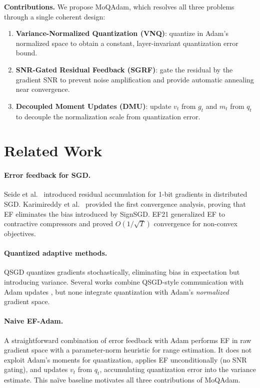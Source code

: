 \documentclass[10pt,twocolumn]{article}
\begin{document}
\textbf{Contributions.}  We propose MoQAdam, which resolves all three
problems through a single coherent design:

\begin{enumerate}
  \item \textbf{Variance-Normalized Quantization (VNQ)}: quantize in
    Adam's normalized space to obtain a constant, layer-invariant
    quantization error bound.
  \item \textbf{SNR-Gated Residual Feedback (SGRF)}: gate the residual
    by the gradient SNR to prevent noise amplification and provide
    automatic annealing near convergence.
  \item \textbf{Decoupled Moment Updates (DMU)}: update $v_t$ from
    $g_t$ and $m_t$ from $q_t$ to decouple the normalization scale
    from quantization error.
\end{enumerate}

\section{Related Work}

\paragraph{Error feedback for SGD.}
Seide et al.\ \cite{seide20141bit} introduced residual accumulation for
1-bit gradients in distributed SGD\@.  Karimireddy et al.\
\cite{karimireddy2019error} provided the first convergence analysis,
proving that EF eliminates the bias introduced by SignSGD\@.
EF21 \cite{richtarik2021ef21} generalized EF to contractive
compressors and proved $O(1/\sqrt{T})$ convergence for non-convex
objectives.

\paragraph{Quantized adaptive methods.}
QSGD \cite{alistarh2017qsgd} quantizes gradients stochastically,
eliminating bias in expectation but introducing variance.  Several works
combine QSGD-style communication with Adam updates
\cite{dettmers2019sparse,karimireddy2019error}, but none integrate
quantization with Adam's \emph{normalized} gradient space.

\paragraph{Naive EF-Adam.}
A straightforward combination of error feedback with Adam performs EF
in raw gradient space with a parameter-norm heuristic for range
estimation.  It does not exploit Adam's moments for quantization,
applies EF unconditionally (no SNR gating), and updates $v_t$ from
$q_t$, accumulating quantization error into the variance estimate.
This na\"{i}ve baseline motivates all three contributions of MoQAdam.
\end{document}
